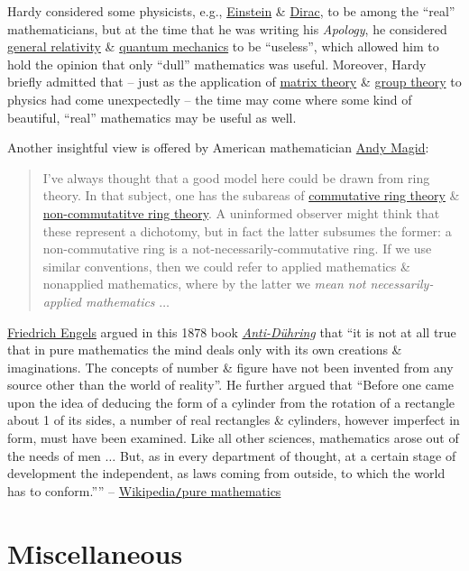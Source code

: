 \documentclass{article}
\begin{document}
{\sc Hardy} considered some physicists, e.g., \href{https://en.wikipedia.org/wiki/Albert_Einstein}{\sc Einstein} \& \href{https://en.wikipedia.org/wiki/Paul_Dirac}{\sc Dirac}, to be among the ``real'' mathematicians, but at the time that he was writing his {\it Apology}, he considered \href{https://en.wikipedia.org/wiki/General_relativity}{general relativity} \& \href{https://en.wikipedia.org/wiki/Quantum_mechanics}{quantum mechanics} to be ``useless'', which allowed him to hold the opinion that only ``dull'' mathematics was useful. Moreover, {\sc Hardy} briefly admitted that -- just as the application of \href{https://en.wikipedia.org/wiki/Matrix_(mathematics)}{matrix theory} \& \href{https://en.wikipedia.org/wiki/Group_theory}{group theory} to physics had come unexpectedly -- the time may come where some kind of beautiful, ``real'' mathematics may be useful as well.

Another insightful view is offered by American mathematician \href{https://en.wikipedia.org/wiki/Andy_Magid}{\sc Andy Magid}:
\begin{quote}
	I've always thought that a good model here could be drawn from ring theory. In that subject, one has the subareas of \href{https://en.wikipedia.org/wiki/Commutative_ring}{commutative ring theory} \& \href{https://en.wikipedia.org/wiki/Non-commutative_ring}{non-commutatitve ring theory}. A uninformed observer might think that these represent a dichotomy, but in fact the latter subsumes the former: a non-commutative ring is a not-necessarily-commutative ring. If we use similar conventions, then we could refer to applied mathematics \& nonapplied mathematics, where by the latter we {\it mean not necessarily-applied mathematics} $\ldots$
\end{quote}
\href{https://en.wikipedia.org/wiki/Friedrich_Engels}{\sc Friedrich Engels} argued in this 1878 book \href{https://en.wikipedia.org/wiki/Anti-D%C3%BChring}{\it Anti-D\"uhring} that ``it is not at all true that in pure mathematics the mind deals only with its own creations \& imaginations. The concepts of number \& figure have not been invented from any source other than the world of reality''. He further argued that ``Before one came upon the idea of deducing the form of a cylinder from the rotation of a rectangle about 1 of its sides, a number of real rectangles \& cylinders, however imperfect in form, must have been examined. Like all other sciences, mathematics arose out of the needs of men $\ldots$ But, as in every department of thought, at a certain stage of development the independent, as laws coming from outside, to which the world has to conform.'''' -- \href{https://en.wikipedia.org/wiki/Pure_mathematics}{Wikipedia{\tt/}pure mathematics}


\section{Miscellaneous}


\printbibliography[heading=bibintoc]
	
\end{document}

